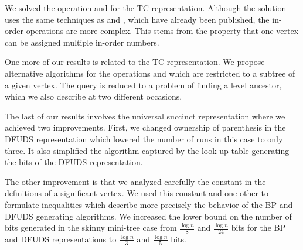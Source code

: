 We solved the operation \inRank{} and \inSelect{} for the TC representation.
Although the solution uses the same techniques as \dfudsRank{} and \dfudsSelect{}, which have already been published, the in-order operations are more complex.
This stems from the property that one vertex can be assigned multiple in-order numbers.

One more of our results is related to the TC representation.
We propose alternative algorithms for the operations \levelFirst{} and \levelLast{} which are restricted to a subtree of a given vertex.
The query is reduced to a problem of finding a level ancestor, which we also describe at two different occasions.

The last of our results involves the universal succinct representation where we achieved two improvements.
First, we changed ownership of parenthesis in the DFUDS representation which lowered the number of runs in this case to only three.
It also simplified the algorithm captured by the look-up table generating the bits of the DFUDS representation.

The other improvement is that we analyzed carefully the constant in the definitions of a significant vertex.
We used this constant and one other to formulate inequalities which describe more precisely the behavior of the BP and DFUDS generating algorithms.
We increased the lower bound on the number of bits generated in the skinny mini-tree case from $\frac{\log n}{8}$ and $\frac{\log n}{24}$ bits for the BP and DFUDS representations to $\frac{\log n}{3}$ and $\frac{\log n}{5}$ bits.


